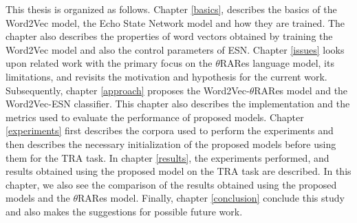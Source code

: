 This thesis is organized as follows. Chapter \ref{basics}, describes the basics of the Word2Vec model, the Echo State Network model and how they are trained. The chapter also describes the properties of word vectors obtained by training the Word2Vec model and also the control parameters of \acs{ESN}. Chapter \ref{issues} looks upon related work with the primary focus on the $\theta$RARes language model, its limitations, and revisits the motivation and hypothesis for the current work. Subsequently, chapter \ref{approach} proposes the Word2Vec-$\theta$RARes model and the Word2Vec-ESN classifier. This chapter also describes the implementation and the metrics used to evaluate the performance of proposed models. Chapter \ref{experiments} first describes the corpora used to perform the experiments and then describes the necessary initialization of the proposed models before using them for the TRA task. In chapter \ref{results}, the experiments performed, and results obtained using the proposed model on the TRA task are described. In this chapter, we also see the comparison of the results obtained using the proposed models and the $\theta$RARes model. Finally, chapter \ref{conclusion} conclude this study and also makes the suggestions for possible future work.